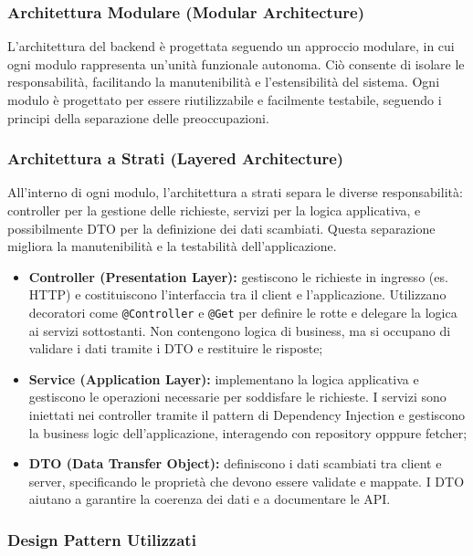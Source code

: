 \subsubsection{Architettura Modulare (Modular Architecture)}
L’architettura del backend è progettata seguendo un approccio modulare, in cui ogni modulo rappresenta un'unità funzionale autonoma. Ciò consente di isolare le responsabilità, facilitando la manutenibilità e l'estensibilità del sistema. Ogni modulo è progettato per essere riutilizzabile e facilmente testabile, seguendo i principi della separazione delle preoccupazioni.

\subsubsection{Architettura a Strati (Layered Architecture)}
All'interno di ogni modulo, l'architettura a strati separa le diverse responsabilità: controller per la gestione delle richieste, servizi per la logica applicativa, e possibilmente DTO per la definizione dei dati scambiati. Questa separazione migliora la manutenibilità e la testabilità dell'applicazione.

\begin{itemize}  
  \item \textbf{Controller (Presentation Layer):} gestiscono le richieste in ingresso (es. HTTP) e costituiscono l'interfaccia tra il client e l'applicazione. Utilizzano decoratori come \texttt{@Controller} e \texttt{@Get} per definire le rotte e delegare la logica ai servizi sottostanti. Non contengono logica di business, ma si occupano di validare i dati tramite i DTO e restituire le risposte;
  
  \item \textbf{Service (Application Layer):} implementano la logica applicativa e gestiscono le operazioni necessarie per soddisfare le richieste. I servizi sono iniettati nei controller tramite il pattern di Dependency Injection e gestiscono la business logic dell'applicazione, interagendo con repository opppure fetcher;
  
  \item \textbf{DTO (Data Transfer Object):} definiscono i dati scambiati tra client e server, specificando le proprietà che devono essere validate e mappate. I DTO aiutano a garantire la coerenza dei dati e a documentare le API.
\end{itemize}

\subsubsection{Design Pattern Utilizzati}

